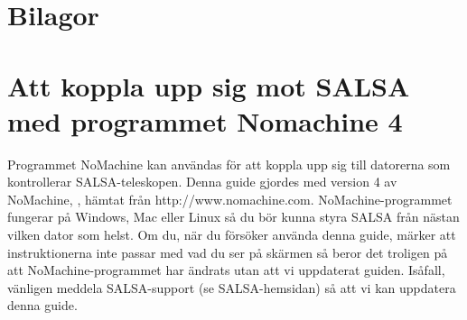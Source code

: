 \chapter*{Bilagor}
\appendix

\chapter{Att koppla upp sig mot SALSA med programmet Nomachine 4}
\label{app:nomachine}
Programmet NoMachine kan användas för att koppla upp sig till datorerna som
kontrollerar SALSA-teleskopen. Denna guide gjordes med version 4 av NoMachine,
, hämtat från http://www.nomachine.com. NoMachine-programmet fungerar på Windows,
Mac eller Linux så du bör kunna styra SALSA från nästan vilken dator som helst. 
Om du, när du försöker använda denna guide, märker att instruktionerna inte passar
med vad du ser på skärmen så beror det troligen på att NoMachine-programmet har 
ändrats utan att vi uppdaterat guiden. Isåfall, vänligen meddela SALSA-support 
(se SALSA-hemsidan) så att vi kan uppdatera denna guide.

